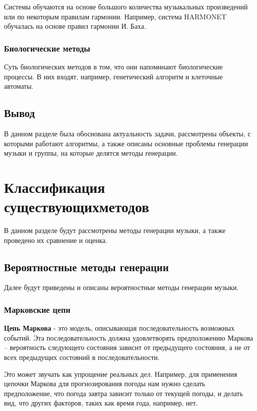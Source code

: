 Системы обучаются на основе большого количества музыкальных произведений или по некоторым правилам гармонии. Например, система \linebreak HARMONET обучалась на основе правил гармонии И. Баха.


\subsection{Биологические методы}

Суть биологических методов в том, что они напоминают биологические процессы. В них входят, например, генетический алгоритм и клеточные автоматы.

\section{Вывод}

В данном разделе была обоснована актуальность задачи, рассмотрены объекты, с которыми работают алгоритмы, а также описаны основные проблемы генерации музыки и группы, на которые делятся методы генерации.


\chapter[Классификация существующих методов]{Классификация существующих\linebreak методов}

В данном разделе будут рассмотрены методы генерации музыки, а также проведено их сравнение и оценка.

\section{Вероятностные методы генерации}

Далее будут приведены и описаны вероятностные методы генерации музыки.

\subsection{Марковские цепи}

\textbf{Цепь Маркова} - это модель, описывающая последовательность возможных событий. Эта последовательность должна удовлетворять предположению Маркова -- вероятность следующего состояния зависит от предыдущего состояния, а не от всех предыдущих состояний в последовательности.

Это может звучать как упрощение реальных дел. Например, для применения цепочки Маркова для прогнозирования погоды нам нужно сделать предположение, что погода завтра зависит только от текущей погоды, и делать вид, что других факторов, таких как время года, например, нет.

